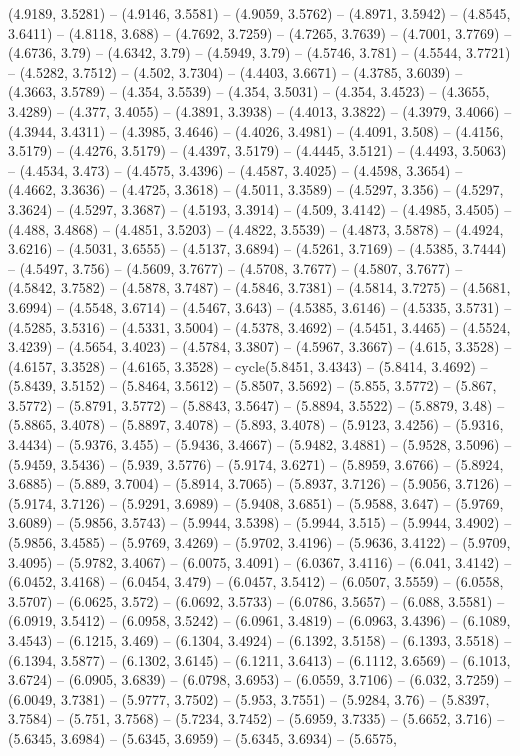 (4.9189, 3.5281) -- (4.9146, 3.5581) -- (4.9059, 3.5762) -- (4.8971, 3.5942) -- (4.8545, 3.6411) -- (4.8118, 3.688) -- (4.7692, 3.7259) -- (4.7265, 3.7639) -- (4.7001, 3.7769) -- (4.6736, 3.79) -- (4.6342, 3.79) -- (4.5949, 3.79) -- (4.5746, 3.781) -- (4.5544, 3.7721) -- (4.5282, 3.7512) -- (4.502, 3.7304) -- (4.4403, 3.6671) -- (4.3785, 3.6039) -- (4.3663, 3.5789) -- (4.354, 3.5539) -- (4.354, 3.5031) -- (4.354, 3.4523) -- (4.3655, 3.4289) -- (4.377, 3.4055) -- (4.3891, 3.3938) -- (4.4013, 3.3822) -- (4.3979, 3.4066) -- (4.3944, 3.4311) -- (4.3985, 3.4646) -- (4.4026, 3.4981) -- (4.4091, 3.508) -- (4.4156, 3.5179) -- (4.4276, 3.5179) -- (4.4397, 3.5179) -- (4.4445, 3.5121) -- (4.4493, 3.5063) -- (4.4534, 3.473) -- (4.4575, 3.4396) -- (4.4587, 3.4025) -- (4.4598, 3.3654) -- (4.4662, 3.3636) -- (4.4725, 3.3618) -- (4.5011, 3.3589) -- (4.5297, 3.356) -- (4.5297, 3.3624) -- (4.5297, 3.3687) -- (4.5193, 3.3914) -- (4.509, 3.4142) -- (4.4985, 3.4505) -- (4.488, 3.4868) -- (4.4851, 3.5203) -- (4.4822, 3.5539) -- (4.4873, 3.5878) -- (4.4924, 3.6216) -- (4.5031, 3.6555) -- (4.5137, 3.6894) -- (4.5261, 3.7169) -- (4.5385, 3.7444) -- (4.5497, 3.756) -- (4.5609, 3.7677) -- (4.5708, 3.7677) -- (4.5807, 3.7677) -- (4.5842, 3.7582) -- (4.5878, 3.7487) -- (4.5846, 3.7381) -- (4.5814, 3.7275) -- (4.5681, 3.6994) -- (4.5548, 3.6714) -- (4.5467, 3.643) -- (4.5385, 3.6146) -- (4.5335, 3.5731) -- (4.5285, 3.5316) -- (4.5331, 3.5004) -- (4.5378, 3.4692) -- (4.5451, 3.4465) -- (4.5524, 3.4239) -- (4.5654, 3.4023) -- (4.5784, 3.3807) -- (4.5967, 3.3667) -- (4.615, 3.3528) -- (4.6157, 3.3528) -- (4.6165, 3.3528) -- cycle(5.8451, 3.4343) -- (5.8414, 3.4692) -- (5.8439, 3.5152) -- (5.8464, 3.5612) -- (5.8507, 3.5692) -- (5.855, 3.5772) -- (5.867, 3.5772) -- (5.8791, 3.5772) -- (5.8843, 3.5647) -- (5.8894, 3.5522) -- (5.8879, 3.48) -- (5.8865, 3.4078) -- (5.8897, 3.4078) -- (5.893, 3.4078) -- (5.9123, 3.4256) -- (5.9316, 3.4434) -- (5.9376, 3.455) -- (5.9436, 3.4667) -- (5.9482, 3.4881) -- (5.9528, 3.5096) -- (5.9459, 3.5436) -- (5.939, 3.5776) -- (5.9174, 3.6271) -- (5.8959, 3.6766) -- (5.8924, 3.6885) -- (5.889, 3.7004) -- (5.8914, 3.7065) -- (5.8937, 3.7126) -- (5.9056, 3.7126) -- (5.9174, 3.7126) -- (5.9291, 3.6989) -- (5.9408, 3.6851) -- (5.9588, 3.647) -- (5.9769, 3.6089) -- (5.9856, 3.5743) -- (5.9944, 3.5398) -- (5.9944, 3.515) -- (5.9944, 3.4902) -- (5.9856, 3.4585) -- (5.9769, 3.4269) -- (5.9702, 3.4196) -- (5.9636, 3.4122) -- (5.9709, 3.4095) -- (5.9782, 3.4067) -- (6.0075, 3.4091) -- (6.0367, 3.4116) -- (6.041, 3.4142) -- (6.0452, 3.4168) -- (6.0454, 3.479) -- (6.0457, 3.5412) -- (6.0507, 3.5559) -- (6.0558, 3.5707) -- (6.0625, 3.572) -- (6.0692, 3.5733) -- (6.0786, 3.5657) -- (6.088, 3.5581) -- (6.0919, 3.5412) -- (6.0958, 3.5242) -- (6.0961, 3.4819) -- (6.0963, 3.4396) -- (6.1089, 3.4543) -- (6.1215, 3.469) -- (6.1304, 3.4924) -- (6.1392, 3.5158) -- (6.1393, 3.5518) -- (6.1394, 3.5877) -- (6.1302, 3.6145) -- (6.1211, 3.6413) -- (6.1112, 3.6569) -- (6.1013, 3.6724) -- (6.0905, 3.6839) -- (6.0798, 3.6953) -- (6.0559, 3.7106) -- (6.032, 3.7259) -- (6.0049, 3.7381) -- (5.9777, 3.7502) -- (5.953, 3.7551) -- (5.9284, 3.76) -- (5.8397, 3.7584) -- (5.751, 3.7568) -- (5.7234, 3.7452) -- (5.6959, 3.7335) -- (5.6652, 3.716) -- (5.6345, 3.6984) -- (5.6345, 3.6959) -- (5.6345, 3.6934) -- (5.6575, 
